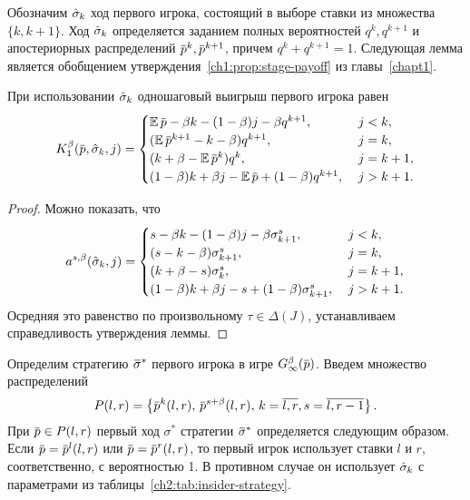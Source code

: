 {Обозначим $\hat{\sigma}_k$ ход первого игрока, состоящий в выборе ставки из множества $\{k, k+1\}$.
Ход $\hat{\sigma}_k$ определяется заданием полных вероятностей $q^k, q^{k+1}$ и апостериорных распределений $\p^k, \p^{k+1}$, причем $q^k + q^{k+1} = 1$.
Следующая лемма является обобщением утверждения~\ref{ch1:prop:stage-payoff} из главы~\ref{chapt1}.
\begin{lemma}
  \label{ch2:lower-bound:lemma:stage-payoff}
  При использовании $\hat{\sigma}_k$ одношаговый выигрыш первого игрока равен
  \begin{equation*}
    \K[1](\p, \sigmak_k, j) = \begin{cases}
      \E \p - \beta k - (1-\beta) j - \beta q^{k+1}, &\; j < k, \\
      (\E \p^{k+1} - k - \beta) q^{k+1}, &\; j = k, \\
      (k + \beta - \E \p^k) q^k, &\; j = k+1, \\
      (1-\beta) k + \beta j - \E \p + (1-\beta) q^{k+1}, &\; j > k + 1.
    \end{cases}
  \end{equation*}
\end{lemma}
\begin{proof}
  Можно показать, что
  \begin{equation*}
    a^{s,\beta}(\hat{\sigma}_k, j) = \begin{cases}
      s - \beta k - (1-\beta) j - \beta \sigma^s_{k+1},     & \; j < k,   \\
      (s - k - \beta) \sigma^s_{k+1},                       & \; j = k,   \\
      (k + \beta - s) \sigma^s_k,                           & \; j = k+1, \\
      (1-\beta) k + \beta j - s + (1-\beta) \sigma^s_{k+1}, & \; j > k + 1.
    \end{cases}
  \end{equation*}
  Осредняя это равенство по произвольному $\tau \in \Delta(J)$, устанавливаем справедливость утверждения леммы.
\end{proof}

Определим стратегию $\sigmav^*$ первого игрока в игре $\theG[\infty](\p)$.
Введем множество распределений
\begin{equation*}
  P(l,r) = \left\{
    \p^k(l, r), \, \p^{s+\beta}(l, r), \, k = \overline{l,r}, s = \overline{l,r-1}
  \right\}.
\end{equation*}
При $\p \in P(l,r)$ первый ход $\sigma^*$ стратегии $\sigmav^*$ определяется следующим образом.
Если $\p = \p^l(l,r)$ или $\p = \p^r(l,r)$, то первый игрок использует ставки $l$ и $r$, соответственно, с вероятностью 1.
В противном случае он использует $\hat{\sigma}_k$ с параметрами из таблицы~\ref{ch2:tab:insider-strategy}.

}
